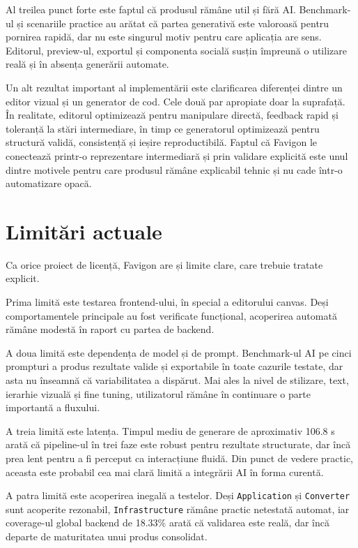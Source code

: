 Al treilea punct forte este faptul că produsul rămâne util și fără AI. Benchmark-ul și scenariile practice au arătat că partea generativă este valoroasă pentru pornirea rapidă, dar nu este singurul motiv pentru care aplicația are sens. Editorul, preview-ul, exportul și componenta socială susțin împreună o utilizare reală și în absența generării automate.

Un alt rezultat important al implementării este clarificarea diferenței dintre un editor vizual și un generator de cod. Cele două par apropiate doar la suprafață. În realitate, editorul optimizează pentru manipulare directă, feedback rapid și toleranță la stări intermediare, în timp ce generatorul optimizează pentru structură validă, consistență și ieșire reproductibilă. Faptul că Favigon le conectează printr-o reprezentare intermediară și prin validare explicită este unul dintre motivele pentru care produsul rămâne explicabil tehnic și nu cade într-o automatizare opacă.

\section{Limitări actuale}

Ca orice proiect de licență, Favigon are și limite clare, care trebuie tratate explicit.

Prima limită este testarea frontend-ului, în special a editorului canvas. Deși comportamentele principale au fost verificate funcțional, acoperirea automată rămâne modestă în raport cu partea de backend.

A doua limită este dependența de model și de prompt. Benchmark-ul AI pe cinci prompturi a produs rezultate valide și exportabile în toate cazurile testate, dar asta nu înseamnă că variabilitatea a dispărut. Mai ales la nivel de stilizare, text, ierarhie vizuală și fine tuning, utilizatorul rămâne în continuare o parte importantă a fluxului.

A treia limită este latența. Timpul mediu de generare de aproximativ 106.8 s arată că pipeline-ul în trei faze este robust pentru rezultate structurate, dar încă prea lent pentru a fi perceput ca interacțiune fluidă. Din punct de vedere practic, aceasta este probabil cea mai clară limită a integrării AI în forma curentă.

A patra limită este acoperirea inegală a testelor. Deși \texttt{Application} și \texttt{Converter} sunt acoperite rezonabil, \texttt{Infrastructure} rămâne practic netestată automat, iar coverage-ul global backend de 18.33\% arată că validarea este reală, dar încă departe de maturitatea unui produs consolidat.

